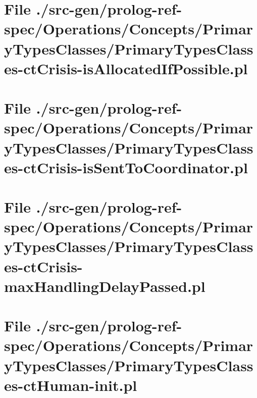 \section[File /src-gen.../PrimaryTypesClasses-ctCrisis-isAllocatedIfPossible.pl]{File ./src-gen/prolog-ref-spec/Operations/Concepts/PrimaryTypesClasses/PrimaryTypesClasses-ctCrisis-isAllocatedIfPossible.pl}
\scriptsize

\normalsize
	
\section[File /src-gen.../PrimaryTypesClasses-ctCrisis-isSentToCoordinator.pl]{File ./src-gen/prolog-ref-spec/Operations/Concepts/PrimaryTypesClasses/PrimaryTypesClasses-ctCrisis-isSentToCoordinator.pl}
\scriptsize

\normalsize
	
\section[File /src-gen.../PrimaryTypesClasses-ctCrisis-maxHandlingDelayPassed.pl]{File ./src-gen/prolog-ref-spec/Operations/Concepts/PrimaryTypesClasses/PrimaryTypesClasses-ctCrisis-maxHandlingDelayPassed.pl}
\scriptsize

\normalsize
	
\section[File /src-gen/prolog-ref-spec/Operations.../PrimaryTypesClasses-ctHuman-init.pl]{File ./src-gen/prolog-ref-spec/Operations/Concepts/PrimaryTypesClasses/PrimaryTypesClasses-ctHuman-init.pl}
\scriptsize

\normalsize
	
